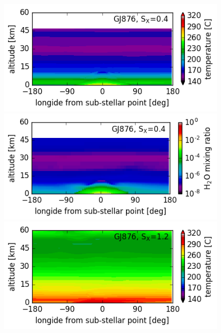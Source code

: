 \documentclass[11pt,numberedappendix,twocolappendix,]{emulateapj}
\begin{document}
\begin{figure}[!hbt]
    \begin{minipage}{0.48\hsize}
    \begin{center}
\includegraphics[width=\hsize]{fig/ANN0109-0134aijlAqOH0TLS_GJ876S04P48L40Q_temp.png}
    \end{center}
     \end{minipage}
  \begin{minipage}{0.48\hsize}
    \begin{center}
    \includegraphics[width=\hsize]{fig/ANN0109-0134aijlAqOH0TLS_GJ876S04P48L40Q_xH2O.png}
    \end{center}
\end{minipage}
    \begin{minipage}{0.48\hsize}
    \begin{center}
\includegraphics[width=\hsize]{fig/ANN0231-0287aijlAqOH0TLS_GJ876S12P21L40Q_temp.png}

\end{center}
\end{minipage}
\end{figure}
\end{document}
